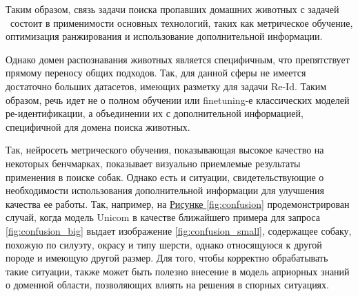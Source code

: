 Таким образом, связь задачи поиска пропавших домашних животных с задачей \reid\ состоит в применимости основных технологий, таких как метрическое обучение, оптимизация ранжирования и использование дополнительной информации.

Однако домен распознавания животных является специфичным, что препятствует прямому переносу общих подходов. Так, для данной сферы не имеется достаточно больших датасетов, имеющих разметку для задачи Re-Id. Таким образом, речь идет не о полном обучении или finetuning-е классических моделей ре-идентификации, а объединении их с дополнительной информацией, специфичной для домена поиска животных.

Так, нейросеть метрического обучения, показывающая высокое качество на некоторых бенчмарках, показывает визуально приемлемые результаты применения в поиске собак. Однако есть и ситуации, свидетельствующие о необходимости использования дополнительной информации для улучшения качества ее работы. Так, например, на \hyperref[fig:confusion]{Рисунке \ref*{fig:confusion}} продемонстрирован случай, когда модель Unicom в качестве ближайшего примера для запроса \ref{fig:confusion_big} выдает изображение \ref{fig:confusion_small}, содержащее собаку, похожую по силуэту, окрасу и типу шерсти, однако относящуюся к другой породе и имеющую другой размер. Для того, чтобы корректно обрабатывать такие ситуации, также может быть полезно внесение в модель априорных знаний о доменной области, позволяющих влиять на решения в спорных ситуациях.

